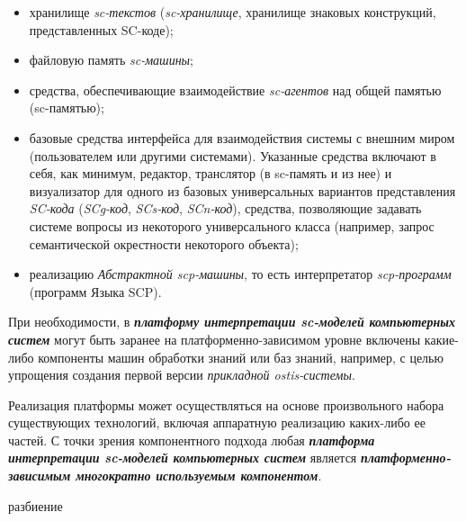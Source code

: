 \begin{itemize}
	\item хранилище \textit{sc-текстов} (\textit{sc-хранилище}, хранилище знаковых конструкций, представленных SC-коде);
	\item файловую память \textit{sc-машины};
	\item средства, обеспечивающие взаимодействие \textit{sc-агентов} над общей памятью (sc-памятью);
	\item базовые средства интерфейса для взаимодействия системы с внешним миром (пользователем или другими системами). Указанные средства включают в себя, как минимум, редактор, транслятор (в sc-память и из нее) и визуализатор для одного из базовых универсальных вариантов представления \textit{SC-кода} (\textit{SCg-код}, \textit{SCs-код}, \textit{SCn-код}), средства, позволяющие задавать системе вопросы из некоторого универсального класса (например, запрос семантической окрестности некоторого объекта);
	\item реализацию \textit{Абстрактной scp-машины}, то есть интерпретатор \textit{scp-программ} (программ Языка SCP).
\end{itemize}

При необходимости, в \textbf{\textit{платформу интерпретации sc-моделей компьютерных систем}} могут быть заранее на платформенно-зависимом уровне включены какие-либо компоненты машин обработки знаний или баз знаний, например, с целью упрощения создания первой версии \textit{прикладной ostis-системы}.

Реализация платформы может осуществляться на основе произвольного набора существующих технологий, включая аппаратную реализацию каких-либо ее частей. С точки зрения компонентного подхода любая \textbf{\textit{платформа интерпретации sc-моделей компьютерных систем}} является \textbf{\textit{платформенно-зависимым многократно используемым компонентом}}.

\begin{SCn}
\begin{scnrelfromset}{разбиение}
\begin{scnindent}
\end{scnindent}
\begin{scnindent}
\end{scnindent}
\end{scnrelfromset}
\end{SCn}

